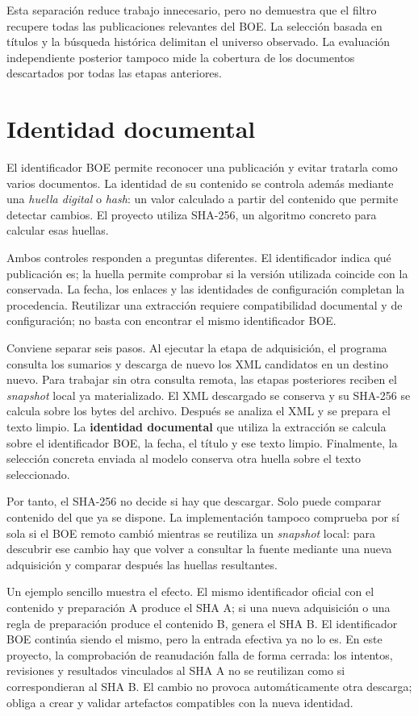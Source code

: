 Esta separación reduce trabajo innecesario, pero no demuestra que el filtro
recupere todas las publicaciones relevantes del BOE. La selección basada en
títulos y la búsqueda histórica delimitan el universo observado. La evaluación
independiente posterior tampoco mide la cobertura de los documentos descartados
por todas las etapas anteriores.

\section{Identidad documental}
\label{sec:identidad-documental}
El identificador BOE permite reconocer una publicación y evitar tratarla como
varios documentos. La identidad de su contenido se controla además mediante
una \emph{huella digital} o \emph{hash}: un valor calculado a partir del
contenido que permite detectar cambios. El proyecto utiliza SHA-256, un
algoritmo concreto para calcular esas huellas.

Ambos controles responden a preguntas diferentes. El identificador indica
qué publicación es; la huella permite comprobar si la versión utilizada
coincide con la conservada. La fecha, los enlaces y las identidades de
configuración completan la procedencia. Reutilizar una extracción requiere
compatibilidad documental y de configuración; no basta con encontrar el
mismo identificador BOE.

Conviene separar seis pasos. Al ejecutar la etapa de adquisición, el programa
consulta los sumarios y descarga de nuevo los XML candidatos en un destino
nuevo. Para trabajar sin otra consulta remota, las etapas posteriores reciben
el \emph{snapshot} local ya materializado. El XML descargado se conserva y su
SHA-256 se calcula sobre los bytes del archivo. Después se analiza el XML y se
prepara el texto limpio. La \textbf{identidad documental} que utiliza la
extracción se calcula sobre el identificador BOE, la fecha, el título y ese
texto limpio. Finalmente, la selección concreta enviada al modelo conserva
otra huella sobre el texto seleccionado.

Por tanto, el SHA-256 no decide si hay que descargar. Solo puede comparar
contenido del que ya se dispone. La implementación tampoco comprueba por sí
sola si el BOE remoto cambió mientras se reutiliza un \emph{snapshot} local:
para descubrir ese cambio hay que volver a consultar la fuente mediante una
nueva adquisición y comparar después las huellas resultantes.

Un ejemplo sencillo muestra el efecto. El mismo identificador oficial con el
contenido y preparación A produce el SHA A; si una nueva adquisición o una
regla de preparación produce el contenido B, genera el SHA B. El identificador
BOE continúa siendo el mismo, pero la entrada efectiva ya no lo es. En este
proyecto, la comprobación de reanudación falla de forma cerrada: los intentos,
revisiones y resultados vinculados al SHA A no se reutilizan como si
correspondieran al SHA B. El cambio no provoca automáticamente otra descarga;
obliga a crear y validar artefactos compatibles con la nueva identidad.

